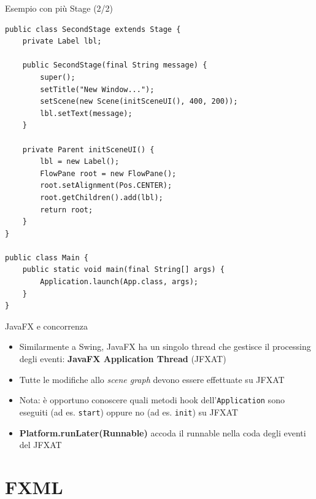 \documentclass[xcolor=dvipsnames,presentation]{beamer}
\begin{document}
\begin{frame}[fragile]{Esempio con più Stage (2/2)}
\begin{lstlisting}[basicstyle=\tiny\ttfamily]
public class SecondStage extends Stage {
    private Label lbl;

    public SecondStage(final String message) {
        super();
	    setTitle("New Window...");
	    setScene(new Scene(initSceneUI(), 400, 200));
	    lbl.setText(message);
    }

    private Parent initSceneUI() {
        lbl = new Label();
	    FlowPane root = new FlowPane();
	    root.setAlignment(Pos.CENTER);
	    root.getChildren().add(lbl);
	    return root;
    }
}

public class Main {
    public static void main(final String[] args) {
        Application.launch(App.class, args); 
    }
}
\end{lstlisting}
\end{frame}


\begin{frame}{JavaFX e concorrenza}

\begin{itemize}
\item Similarmente a Swing, JavaFX
 ha un singolo thread che gestisce il processing degli eventi: \textbf{JavaFX Application Thread} (JFXAT)
\item Tutte le modifiche allo \emph{scene graph} devono essere effettuate su JFXAT
\item Nota: è opportuno conoscere quali metodi hook dell'\texttt{Application} sono eseguiti (ad es. \texttt{start}) oppure no (ad es. \texttt{init}) su JFXAT
\item \textbf{Platform.runLater(Runnable)}
 accoda il runnable nella coda degli eventi del JFXAT
\end{itemize}

\end{frame}


\section{FXML}
\end{document}
